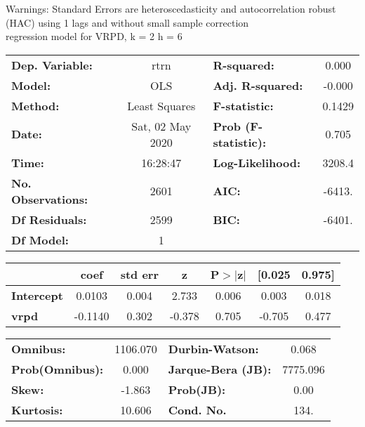 Warnings: \newline
 [1] Standard Errors are heteroscedasticity and autocorrelation robust (HAC) using 1 lags and without small sample correction\\ 

regression model for VRPD, k = 2 h = 6\begin{center}
\begin{tabular}{lclc}
\toprule
\textbf{Dep. Variable:}    &       rtrn       & \textbf{  R-squared:         } &     0.000   \\
\textbf{Model:}            &       OLS        & \textbf{  Adj. R-squared:    } &    -0.000   \\
\textbf{Method:}           &  Least Squares   & \textbf{  F-statistic:       } &    0.1429   \\
\textbf{Date:}             & Sat, 02 May 2020 & \textbf{  Prob (F-statistic):} &    0.705    \\
\textbf{Time:}             &     16:28:47     & \textbf{  Log-Likelihood:    } &    3208.4   \\
\textbf{No. Observations:} &        2601      & \textbf{  AIC:               } &    -6413.   \\
\textbf{Df Residuals:}     &        2599      & \textbf{  BIC:               } &    -6401.   \\
\textbf{Df Model:}         &           1      & \textbf{                     } &             \\
\bottomrule
\end{tabular}
\begin{tabular}{lcccccc}
                   & \textbf{coef} & \textbf{std err} & \textbf{z} & \textbf{P$> |$z$|$} & \textbf{[0.025} & \textbf{0.975]}  \\
\midrule
\textbf{Intercept} &       0.0103  &        0.004     &     2.733  &         0.006        &        0.003    &        0.018     \\
\textbf{vrpd}      &      -0.1140  &        0.302     &    -0.378  &         0.705        &       -0.705    &        0.477     \\
\bottomrule
\end{tabular}
\begin{tabular}{lclc}
\textbf{Omnibus:}       & 1106.070 & \textbf{  Durbin-Watson:     } &    0.068  \\
\textbf{Prob(Omnibus):} &   0.000  & \textbf{  Jarque-Bera (JB):  } & 7775.096  \\
\textbf{Skew:}          &  -1.863  & \textbf{  Prob(JB):          } &     0.00  \\
\textbf{Kurtosis:}      &  10.606  & \textbf{  Cond. No.          } &     134.  \\
\bottomrule
\end{tabular}
\end{center}

